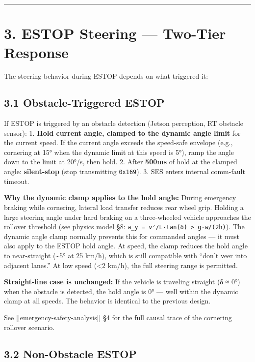 \documentclass[12pt,a4paper,oneside]{report}
\begin{document}
\begin{center}\rule{0.5\linewidth}{0.5pt}\end{center}

\section{3. ESTOP Steering --- Two-Tier
Response}\label{estop-steering-two-tier-response}

The steering behavior during ESTOP depends on what triggered it:

\subsection{3.1 Obstacle-Triggered ESTOP}\label{obstacle-triggered-estop}

If ESTOP is triggered by an obstacle detection (Jetson perception, RT obstacle
sensor): 1. \textbf{Hold current angle, clamped to the dynamic angle limit} for
the current speed. If the current angle exceeds the speed-safe envelope (e.g.,
cornering at 15° when the dynamic limit at this speed is 5°), ramp the angle
down to the limit at 20°/s, then hold. 2. After \textbf{500ms} of hold at the
clamped angle: \textbf{silent-stop} (stop transmitting \texttt{0x169}). 3. SES
enters internal comm-fault timeout.

\textbf{Why the dynamic clamp applies to the hold angle:} During emergency
braking while cornering, lateral load transfer reduces rear wheel grip. Holding
a large steering angle under hard braking on a three-wheeled vehicle approaches
the rollover threshold (see physics model §8:
\texttt{a\_y\ =\ v²/L·tan(δ)\ \textgreater{}\ g·w/(2h)}). The dynamic angle
clamp normally prevents this for commanded angles --- it must also apply to the
ESTOP hold angle. At speed, the clamp reduces the hold angle to near-straight
(\textasciitilde5° at 25 km/h), which is still compatible with ``don't veer into
adjacent lanes.'' At low speed (\textless2 km/h), the full steering range is
permitted.

\textbf{Straight-line case is unchanged:} If the vehicle is traveling straight
(δ ≈ 0°) when the obstacle is detected, the hold angle is 0° --- well within the
dynamic clamp at all speeds. The behavior is identical to the previous design.

See {[}{[}emergency-safety-analysis{]}{]} §4 for the full causal trace of the
cornering rollover scenario.

\subsection{3.2 Non-Obstacle ESTOP}\label{non-obstacle-estop}
\end{document}
